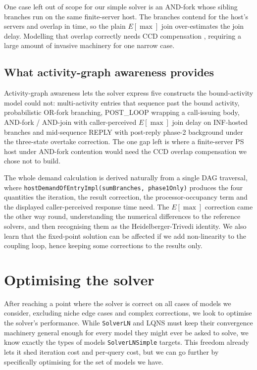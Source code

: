 One case left out of scope for our simple solver is an AND-fork whose sibling branches run on the same finite-server host. The branches contend for the host's servers and overlap in time, so the plain $E[\max]$ join over-estimates the join delay. Modelling that overlap correctly needs CCD compensation \cite{heidelberger83}, requiring a large amount of invasive machinery for one narrow case.


\subsection{What activity-graph awareness provides}

Activity-graph awareness lets the solver express five constructs the bound-activity model could not: multi-activity entries that sequence past the bound activity, probabilistic OR-fork branching, POST\_LOOP wrapping a call-issuing body, AND-fork / AND-join with caller-perceived $E[\max]$ join delay on INF-hosted branches and mid-sequence REPLY with post-reply phase-2 background under the three-state overtake correction. The one gap left is where a finite-server PS host under AND-fork contention would need the CCD overlap compensation we chose not to build.

The whole demand calculation is derived naturally from a single DAG traversal, where \texttt{hostDemandOfEntryImpl(sumBranches, phase1Only)} produces the four quantities the iteration, the result correction, the processor-occupancy term and the displayed caller-perceived response time need. The $E[\max]$ correction came the other way round, understanding the numerical differences to the reference solvers, and then recognising them as the Heidelberger-Trivedi identity. We also learn that the fixed-point solution can be affected if we add non-linearity to the coupling loop, hence keeping some corrections to the results only.




\section{Optimising the solver}
\label{sec:DRAFT-perf-optimisation}

After reaching a point where the solver is correct on all cases of models we consider, excluding niche edge cases and complex corrections, we look to optimise the solver's performance. While \texttt{SolverLN} and LQNS must keep their convergence machinery general enough for every model they might ever be asked to solve, we know exactly the types of models \texttt{SolverLNSimple} targets. This freedom already lets it shed iteration cost and per-query cost, but we can go further by specifically optimising for the set of models we have.

